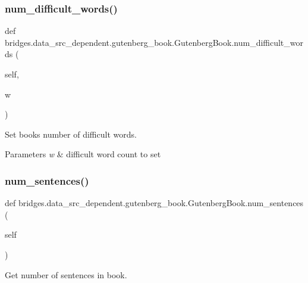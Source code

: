 \subsubsection{\texorpdfstring{num\+\_\+difficult\+\_\+words()}{num\_difficult\_words()}\hspace{0.1cm}{\footnotesize\ttfamily [2/2]}}
{\footnotesize\ttfamily def bridges.\+data\+\_\+src\+\_\+dependent.\+gutenberg\+\_\+book.\+Gutenberg\+Book.\+num\+\_\+difficult\+\_\+words (\begin{DoxyParamCaption}\item[{}]{self,  }\item[{}]{w }\end{DoxyParamCaption})}



Set book\textquotesingle{}s number of difficult words. 


\begin{DoxyParams}{Parameters}
{\em w} & difficult word count to set \\
\hline
\end{DoxyParams}
\mbox{\label{classbridges_1_1data__src__dependent_1_1gutenberg__book_1_1_gutenberg_book_a9f206d0c36bf4e0956d78bc3bf951ab4}} 
\subsubsection{\texorpdfstring{num\+\_\+sentences()}{num\_sentences()}\hspace{0.1cm}{\footnotesize\ttfamily [1/2]}}
{\footnotesize\ttfamily def bridges.\+data\+\_\+src\+\_\+dependent.\+gutenberg\+\_\+book.\+Gutenberg\+Book.\+num\+\_\+sentences (\begin{DoxyParamCaption}\item[{}]{self }\end{DoxyParamCaption})}



Get number of sentences in book. 

